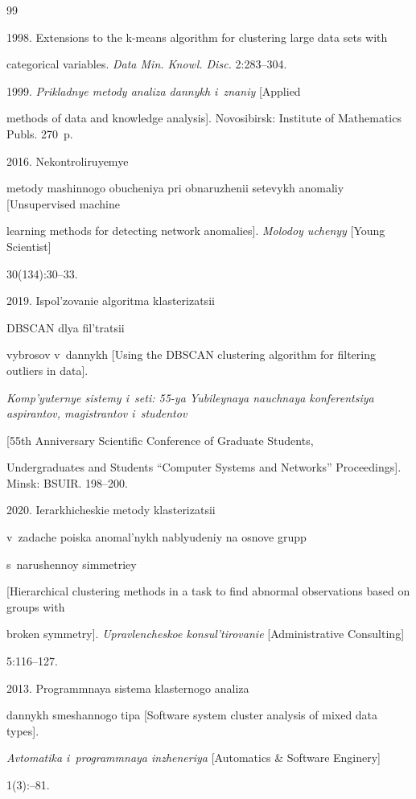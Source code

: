 {{\begin{thebibliography}{99}


   1998. Extensions to the k-means algorithm for clustering large data sets with 


categorical variables. \textit{Data Min. Knowl. Disc.} 2:283--304.




   1999. \textit{Prikladnye metody analiza dannykh i~znaniy} [Applied 


methods of data and knowledge analysis]. Novosibirsk: Institute of Mathematics Publs. 270~p.




   2016. Nekontroliruyemye 


metody mashinnogo obucheniya pri obnaruzhenii setevykh anomaliy [Unsupervised machine 


learning methods for detecting network anomalies]. \textit{Molodoy uchenyy} [Young Scientist] 


30(134):30--33.




   2019. Ispol'zovanie algoritma klasterizatsii 


  DBSCAN dlya fil'tratsii 


vybrosov v~dannykh [Using the DBSCAN clustering algorithm for filtering outliers in data]. 


\textit{Komp'yuternye sistemy i~seti: 55-ya Yubileynaya nauchnaya konferentsiya aspirantov, magistrantov i~studentov} 


[55th Anniversary Scientific Conference of Graduate Students, 


Undergraduates and Students ``Computer Systems and Networks'' Proceedings]. Minsk: BSUIR. 198--200.




   2020. Ierarkhicheskie metody klasterizatsii 


v~zadache poiska anomal'nykh nablyudeniy na osnove grupp 


s~narushennoy simmetriey 


[Hierarchical clustering methods in a task to find abnormal observations based on groups with 


broken symmetry]. \textit{Upravlencheskoe konsul'tirovanie} [Administrative Consulting]  


5:116--127.




   2013. Programmnaya sistema klasternogo analiza 


dannykh smeshannogo tipa [Software system cluster analysis of mixed data types]. 


\textit{Avtomatika i~programmnaya inzheneriya} [Automatics \& Software Enginery]  


1(3):--81.


\end{thebibliography}


} }
